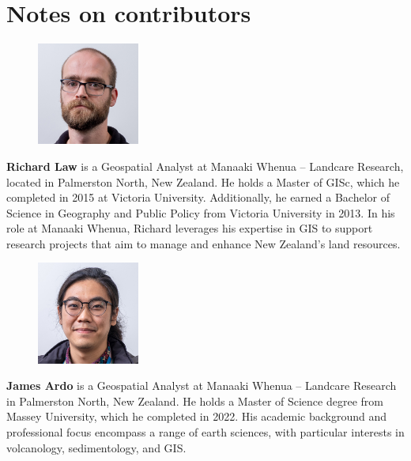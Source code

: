 \documentclass[]{interact}
\theoremstyle{plain}%
\theoremstyle{definition}
\theoremstyle{remark}
\begin{document}
\section*{Notes on contributors}

\begin{figure}
\centering
\includegraphics[width=0.3\textwidth]{images/richard}
\end{figure}
\textbf{Richard Law} is a Geospatial Analyst at Manaaki Whenua -- Landcare Research, located in Palmerston North, New Zealand. He holds a Master of \ac{GISc}, which he completed in 2015 at Victoria University. Additionally, he earned a Bachelor of Science in Geography and Public Policy from Victoria University in 2013. In his role at Manaaki Whenua, Richard leverages his expertise in \ac{GIS} to support research projects that aim to manage and enhance New Zealand's land resources.\\

\begin{figure}
\centering
\includegraphics[width=0.3\textwidth]{images/james.jpg}
\end{figure}
\textbf{James Ardo} is a Geospatial Analyst at Manaaki Whenua -- Landcare Research in Palmerston North, New Zealand. He holds a Master of Science degree from Massey University, which he completed in 2022. His academic background and professional focus encompass a range of earth sciences, with particular interests in volcanology, sedimentology, and \ac{GIS}.\\

\clearpage




\end{document}
